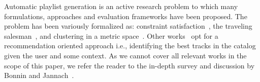 






%
%

Automatic playlist generation is an active research problem to which many formulations, approaches and evaluation frameworks have been proposed. 
The problem has been variously formalized as:  constraint satisfaction~\cite{Pauws2008647}, the traveling salesman~\cite{Knees:2006}, and clustering in a metric space~\cite{Pauws:ISMIR02}. Other works~\cite{Hariri:2012, Jannach:2015,a2mf} opt for a recommendation oriented approach i.e., identifying the best tracks in the catalog given the user and some context. As we cannot cover all relevant works in the scope of this paper, we refer the reader to the in-depth survey and discussion by Bonnin and Jannach~\cite{playlist_survey}.


